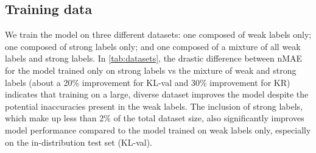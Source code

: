 \subsection{Training data}
\vspace{-10pt}
\begin{table}[h]
\centering
{} %
\vspace{-5pt}
\caption{\footnotesize 
 Dataset choice vs performance on KL-val and KR, split by downstream (``down'') and upstream (``up'') moving fish.  Training with strong and weak labels improves over both a small dataset of strong labels only, and a large, diverse dataset of weak labels only.}
 \vspace{-5pt}
\label{tab:datasets}
\end{table}

We train the model on three different datasets: one composed of weak labels only; one composed of strong labels only; and one composed of a mixture of all weak labels and strong labels. In \cref{tab:datasets}, the drastic difference between nMAE for the model trained only on strong labels vs the mixture of weak and strong labels (about a 20\% improvement for KL-val and 30\% improvement for KR) indicates that training on a large, diverse dataset improves the model despite the potential inaccuracies present in the weak labels. The inclusion of strong labels, which make up less than 2\% of the total dataset size, also significantly improves model performance compared to the model trained on weak labels only, especially on the in-distribution test set (KL-val). 

